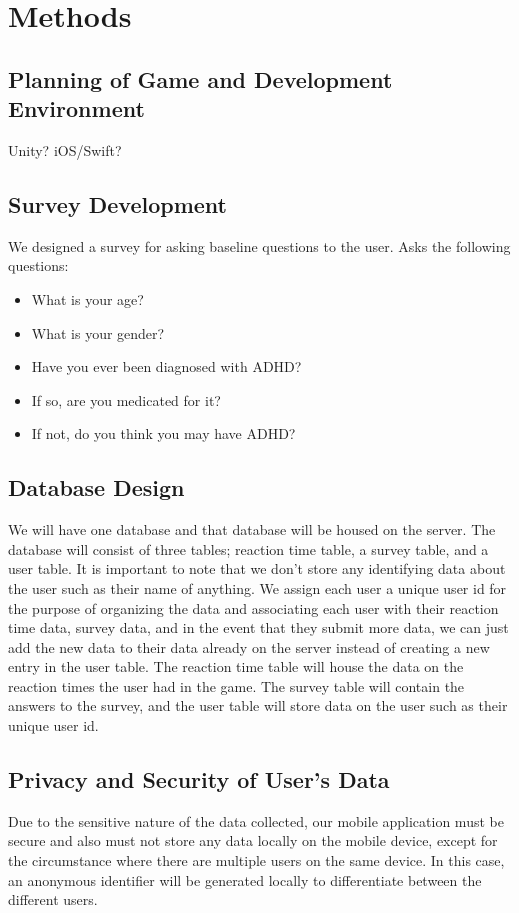 \documentclass[a4wide]{article}
\begin{document}
\section{Methods}
\subsection{Planning of Game and Development Environment}
Unity? iOS/Swift?
\subsection{Survey Development}
We designed a survey for asking baseline questions to the user.
Asks the following questions:

\begin{itemize}
  \item What is your age?
  \item What is your gender?
  \item Have you ever been diagnosed with ADHD?
  \item If so, are you medicated for it?
  \item If not, do you think you may have ADHD?
\end{itemize}

\subsection{Database Design}
\- We will have one database and that database will be housed on the server. The database will consist of three tables; reaction time table, a survey table, and a user table. It is important to note that we don't store any identifying data about the user such as their name of anything. We assign each user a unique user id for the purpose of organizing the data and associating each user with their reaction time data, survey data, and in the event that they submit more data, we can just add the new data to their data already on the server instead of creating a new entry in the user table. The reaction time table will house the data on the reaction times the user had in the game. The survey table will contain the answers to the survey, and the user table will store data on the user such as their unique user id.
\subsection{Privacy and Security of User's Data}
\- Due to the sensitive nature of the data collected, our mobile application must be secure and also must not store any data locally on the mobile device, except for the circumstance where there are multiple users on the same device. In this case, an anonymous identifier will be generated locally to differentiate between the different users. 
\end{document}
